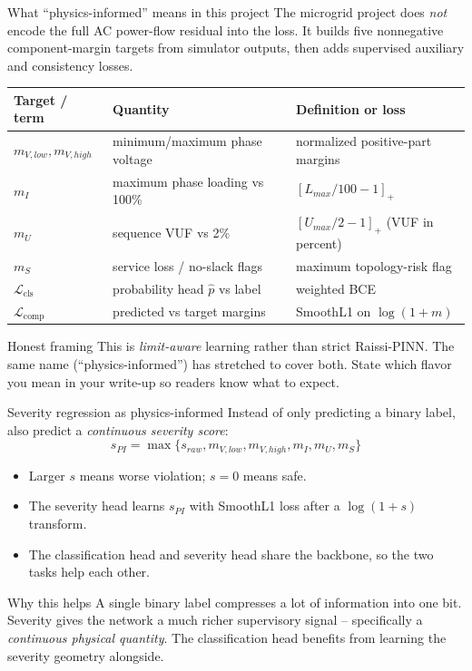 \documentclass[aspectratio=169,10pt]{beamer}
\begin{document}
\begin{frame}{What ``physics-informed'' means in this project}
The microgrid project does \emph{not} encode the full AC power-flow residual into the loss. It builds five nonnegative component-margin targets from simulator outputs, then adds supervised auxiliary and consistency losses.
\vspace{0.4em}
\centering
\small
\begin{tabular}{lll}
\toprule
Target / term & Quantity & Definition or loss \\
\midrule
$m_{V,low},m_{V,high}$ & minimum/maximum phase voltage & normalized positive-part margins \\
$m_I$ & maximum phase loading vs 100\% & $[L_{max}/100-1]_+$ \\
$m_U$ & sequence VUF vs 2\% & $[U_{max}/2-1]_+$ (VUF in percent) \\
$m_S$ & service loss / no-slack flags & maximum topology-risk flag \\
$\mathcal{L}_{\text{cls}}$ & probability head $\hat{p}$ vs label & weighted BCE \\
$\mathcal{L}_{\text{comp}}$ & predicted vs target margins & SmoothL1 on $\log(1+m)$ \\
\bottomrule
\end{tabular}
\vspace{0.5em}
\begin{alertblock}{Honest framing}
This is \emph{limit-aware} learning rather than strict Raissi-PINN. The same name (``physics-informed'') has stretched to cover both. State which flavor you mean in your write-up so readers know what to expect.
\end{alertblock}
\end{frame}

\begin{frame}{Severity regression as physics-informed}
Instead of only predicting a binary label, also predict a \emph{continuous severity score}:
\begin{equation*}
s_{PI}=\max\{s_{raw},m_{V,low},m_{V,high},m_I,m_U,m_S\}
\end{equation*}
\vspace{0.2em}
\begin{itemize}
  \item Larger $s$ means worse violation; $s = 0$ means safe.
  \item The severity head learns $s_{PI}$ with SmoothL1 loss after a $\log(1+s)$ transform.
  \item The classification head and severity head share the backbone, so the two tasks help each other.
\end{itemize}
\vspace{0.4em}
\begin{block}{Why this helps}
A single binary label compresses a lot of information into one bit. Severity gives the network a much richer supervisory signal -- specifically a \emph{continuous physical quantity}. The classification head benefits from learning the severity geometry alongside.
\end{block}
\end{frame}
\end{document}
